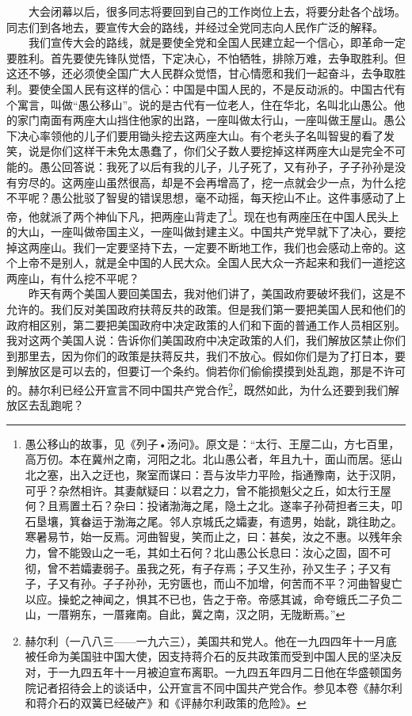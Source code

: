 \documentclass[cn,11pt,chinese]{elegantbook}
\begin{document}
　　大会闭幕以后，很多同志将要回到自己的工作岗位上去，将要分赴各个战场。同志们到各地去，要宣传大会的路线，并经过全党同志向人民作广泛的解释。\\
　　我们宣传大会的路线，就是要使全党和全国人民建立起一个信心，即革命一定要胜利。首先要使先锋队觉悟，下定决心，不怕牺牲，排除万难，去争取胜利。但这还不够，还必须使全国广大人民群众觉悟，甘心情愿和我们一起奋斗，去争取胜利。要使全国人民有这样的信心：中国是中国人民的，不是反动派的。中国古代有个寓言，叫做“愚公移山”。说的是古代有一位老人，住在华北，名叫北山愚公。他的家门南面有两座大山挡住他家的出路，一座叫做太行山，一座叫做王屋山。愚公下决心率领他的儿子们要用锄头挖去这两座大山。有个老头子名叫智叟的看了发笑，说是你们这样干未免太愚蠢了，你们父子数人要挖掉这样两座大山是完全不可能的。愚公回答说：我死了以后有我的儿子，儿子死了，又有孙子，子子孙孙是没有穷尽的。这两座山虽然很高，却是不会再增高了，挖一点就会少一点，为什么挖不平呢？愚公批驳了智叟的错误思想，毫不动摇，每天挖山不止。这件事感动了上帝，他就派了两个神仙下凡，把两座山背走了\footnote[2]{ 愚公移山的故事，见《列子•汤问》。原文是：“太行、王屋二山，方七百里，高万仞。本在冀州之南，河阳之北。北山愚公者，年且九十，面山而居。惩山北之塞，出入之迂也，聚室而谋曰：吾与汝毕力平险，指通豫南，达于汉阴，可乎？杂然相许。其妻献疑曰：以君之力，曾不能损魁父之丘，如太行王屋何？且焉置土石？杂曰：投诸渤海之尾，隐土之北。遂率子孙荷担者三夫，叩石垦壤，箕畚运于渤海之尾。邻人京城氏之孀妻，有遗男，始龀，跳往助之。寒暑易节，始一反焉。河曲智叟，笑而止之，曰：甚矣，汝之不惠。以残年余力，曾不能毁山之一毛，其如土石何？北山愚公长息曰：汝心之固，固不可彻，曾不若孀妻弱子。虽我之死，有子存焉；子又生孙，孙又生子；子又有子，子又有孙。子子孙孙，无穷匮也，而山不加增，何苦而不平？河曲智叟亡以应。操蛇之神闻之，惧其不已也，告之于帝。帝感其诚，命夸蛾氏二子负二山，一厝朔东，一厝雍南。自此，冀之南，汉之阴，无陇断焉。”}。现在也有两座压在中国人民头上的大山，一座叫做帝国主义，一座叫做封建主义。中国共产党早就下了决心，要挖掉这两座山。我们一定要坚持下去，一定要不断地工作，我们也会感动上帝的。这个上帝不是别人，就是全中国的人民大众。全国人民大众一齐起来和我们一道挖这两座山，有什么挖不平呢？\\
　　昨天有两个美国人要回美国去，我对他们讲了，美国政府要破坏我们，这是不允许的。我们反对美国政府扶蒋反共的政策。但是我们第一要把美国人民和他们的政府相区别，第二要把美国政府中决定政策的人们和下面的普通工作人员相区别。我对这两个美国人说：告诉你们美国政府中决定政策的人们，我们解放区禁止你们到那里去，因为你们的政策是扶蒋反共，我们不放心。假如你们是为了打日本，要到解放区是可以去的，但要订一个条约。倘若你们偷偷摸摸到处乱跑，那是不许可的。赫尔利已经公开宣言不同中国共产党合作\footnote[3]{ 赫尔利（一八八三——一九六三），美国共和党人。他在一九四四年十一月底被任命为美国驻中国大使，因支持蒋介石的反共政策而受到中国人民的坚决反对，于一九四五年十一月被迫宣布离职。一九四五年四月二日他在华盛顿国务院记者招待会上的谈话中，公开宣言不同中国共产党合作。参见本卷《赫尔利和蒋介石的双簧已经破产》和《评赫尔利政策的危险》。}，既然如此，为什么还要到我们解放区去乱跑呢？\\
\end{document}
